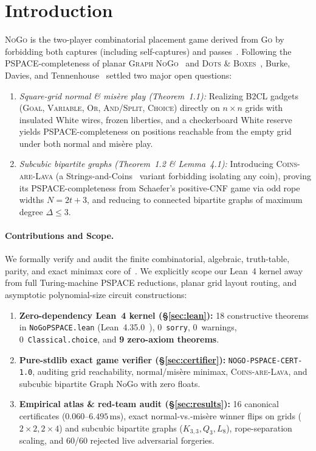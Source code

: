 \documentclass[11pt,twocolumn]{article}
\begin{document}
\section{Introduction}
\textsc{NoGo} is the two-player combinatorial placement game derived from \textsc{Go} by forbidding both captures (including self-captures) and passes~\cite{burke2019pspace,hearn2009games}. Following the PSPACE-completeness of planar \textsc{Graph NoGo}~\cite{burke2019pspace} and \textsc{Dots \& Boxes}~\cite{buchin2021dots}, Burke, Davies, and Tennenhouse~\cite{burke2026nogo} settled two major open questions:
\begin{enumerate}[leftmargin=*,nosep]
  \item \emph{Square-grid normal \& mis\`ere play (Theorem~1.1):} Realizing B2CL gadgets (\textsc{Goal}, \textsc{Variable}, \textsc{Or}, \textsc{And}/\textsc{Split}, \textsc{Choice}) directly on $n \times n$ grids with insulated White wires, frozen liberties, and a checkerboard White reserve yields PSPACE-completeness on positions reachable from the empty grid under both normal and mis\`ere play.
  \item \emph{Subcubic bipartite graphs (Theorem~1.2 \& Lemma~4.1):} Introducing \textsc{Coins-are-Lava} (a Strings-and-Coins~\cite{demaine2021strings} variant forbidding isolating any coin), proving its PSPACE-completeness from Schaefer's positive-CNF game via odd rope widths $N = 2t+3$, and reducing to connected bipartite graphs of maximum degree $\Delta \le 3$.
\end{enumerate}

\paragraph{Contributions and Scope.}
We formally verify and audit the finite combinatorial, algebraic, truth-table, parity, and exact minimax core of~\cite{burke2026nogo}. We explicitly scope our Lean~4 kernel away from full Turing-machine PSPACE reductions, planar grid layout routing, and asymptotic polynomial-size circuit constructions:
\begin{enumerate}[leftmargin=*,nosep]
  \item \textbf{Zero-dependency Lean~4 kernel (\S\ref{sec:lean}):} 18 constructive theorems in \texttt{NoGoPSPACE.lean} (Lean~4.35.0~\cite{demoura2021lean4}), 0~\texttt{sorry}, 0~warnings, 0~\texttt{Classical.choice}, and \textbf{9 zero-axiom theorems}.
  \item \textbf{Pure-stdlib exact game verifier (\S\ref{sec:certifier}):} \texttt{NOGO-PSPACE-CERT-1.0}, auditing grid reachability, normal/mis\`ere minimax, \textsc{Coins-are-Lava}, and subcubic bipartite Graph NoGo with zero floats.
  \item \textbf{Empirical atlas \& red-team audit (\S\ref{sec:results}):} 16 canonical certificates ($0.060$--$6.495\,\mathrm{ms}$), exact normal-vs.-mis\`ere winner flips on grids ($2\times 2, 2\times 4$) and subcubic bipartite graphs ($K_{3,3}, Q_3, L_8$), rope-separation scaling, and 60/60 rejected live adversarial forgeries.
\end{enumerate}
\end{document}
